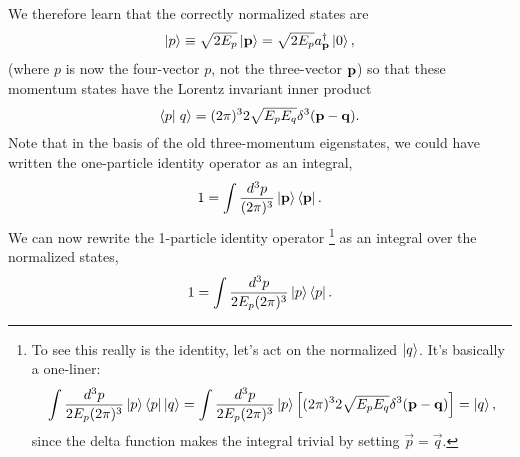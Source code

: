 We therefore learn that the correctly normalized states are
$$\left| p \right>\equiv \sqrt{2E_p}\left| \boldsymbol{\mathbf{p}} \right> = \sqrt{2 E_p}a_{\boldsymbol{\mathbf{p}}}^\dagger \left| 0 \right>,$$
(where $p$ is now the four-vector $p$, not the three-vector $\boldsymbol{\mathbf{p}}$) so that these momentum states have the Lorentz invariant inner product
$$\braket{p}{q}=(2\pi)^3 2\sqrt{E_p E_q} \delta^3(\pv - \vec q).$$
Note that in the basis of the old three-momentum eigenstates, we could have written the one-particle identity operator as an integral,
$$1=\int \frac{d^3p}{(2\pi)^3} \left| \boldsymbol{\mathbf{p}} \right>\left< \boldsymbol{\mathbf{p}} \right|.$$
We can now rewrite the 1-particle identity operator%
    \footnote{To see this really is the identity, let's act on the normalized $\left| q \right>$. It's basically a one-liner:
    $$\int \frac{d^3p}{2E_p(2\pi)^3}\left| p \right>\left< p \right|\left| q \right>=\int\frac{d^3p}{2E_p(2\pi)^3}\left| p \right>\left[(2\pi)^3 2\sqrt{E_pE_q}\delta^3(\boldsymbol{\mathbf{p}}-\boldsymbol{\mathbf{q}})\right]=\left| q \right>,$$ since the delta function makes the integral trivial by setting $\vec p = \vec q$.}
as an integral over the normalized states,
$$1=\int \frac{d^3p}{2E_p(2\pi)^3} \left| p \right>\left< p \right|.$$


